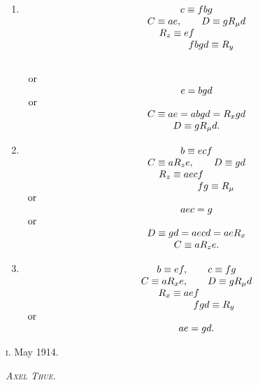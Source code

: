 \begin{enumerate}
\bigskip

\item $\begin{array}[t]{c}
c \equiv fbg\\
C \equiv ae, \qquad D \equiv g R_\mu d\\
\begin{array}{r@{}c@{}l}
R_z \equiv e&f&\\
      &f&bgd \equiv R_y
\end{array}\\
\makebox[\textwidth][l]{}\\
\end{array}$

$\begin{array}[t]{c}
\makebox[\textwidth][l]{or}\\
e = bgd\\
\makebox[\textwidth][l]{or}\\
C \equiv ae = abgd = R_xgd\\
D \equiv gR_\mu d.
\end{array}$

\bigskip

\item $\begin{array}[t]{c}
b \equiv ecf\\
C \equiv aR_z e, \qquad D \equiv gd\\
\begin{array}{r@{}c@{}l}
R_z \equiv aec&f&\\
      &f&g \equiv R_\mu
\end{array}\\
\makebox[\textwidth][l]{or}\\
aec = g\\
\makebox[\textwidth][l]{or}\\
D \equiv gd = aecd = ae R_x\\
C \equiv a R_z e.
\end{array}$

\bigskip


\item $\begin{array}[t]{c}
b \equiv ef, \qquad c \equiv fg\\
C \equiv aR_x e, \qquad D \equiv g R_\mu d\\
\begin{array}{r@{}c@{}l}
R_x \equiv ae&f&\\
      &f&gd \equiv R_y
\end{array}\\
\makebox[\textwidth][l]{or}\\
ae = gd.
\end{array}$

\end{enumerate}

\bigskip
\noindent
\textsc{i}. May 1914.

\hfill \textsc{\large{\emph{Axel Thue.}}}

\begin{center}
\begin{tabular}{p{}}
\\ \hline\hline
\end{tabular}
\end{center}





